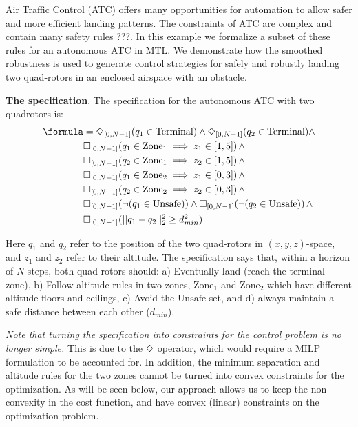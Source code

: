
Air Traffic Control (ATC) offers many opportunities for automation to allow safer and more efficient landing patterns. 
The constraints of ATC are complex and contain many safety rules \cite{}???. 
In this example we formalize a subset of these rules for an autonomous ATC in MTL.
We demonstrate how the smoothed robustness is used to generate control strategies for safely and robustly landing two quad-rotors in an enclosed airspace with an obstacle. 

\textbf{The specification}.
The specification for the autonomous ATC with two quadrotors is:
{\small
\begin{subequations}
\begin{align}
\formula &= \eventually_{[0,N-1]}(q_1 \in \text{Terminal}) \land \eventually_{[0,N-1]}(q_2 \in \text{Terminal}) \land   \nonumber \\
& \always_{[0,N-1]} (q_1 \in \text{Zone}_1 \implies z_1 \in [1,5]) \, \land \nonumber \\
& \always_{[0,N-1]} (q_2 \in \text{Zone}_1 \implies z_2 \in [1,5]) \, \land \nonumber \\
& \always_{[0,N-1]} (q_1 \in \text{Zone}_2 \implies z_1 \in [0,3]) \, \land \nonumber \\
& \always_{[0,N-1]} (q_2 \in \text{Zone}_2 \implies z_2 \in [0,3]) \, \land \nonumber \\
& \always_{[0,N-1]} (\neg (q_1 \in \text{Unsafe})) \land \always_{[0,N-1]} (\neg (q_2 \in \text{Unsafe})) \, \land  \nonumber \\
& \always_{[0,N-1]} (||q_1-q_2||_2^2 \geq d_{min}^2)
\end{align}
\end{subequations}
}

Here $q_1$ and $q_2$ refer to the position of the two quad-rotors in $(x,y,z)$-space, and $z_1$ and $z_2$ refer to their altitude. 
The specification says that, within a horizon of $N$ steps,  both quad-rotors 
should: 
a) Eventually land (reach the terminal zone), 
b) Follow altitude rules in two zones, $\text{Zone}_1$ and $\text{Zone}_2$ which have different altitude floors and ceilings,
c) Avoid the $\text{Unsafe}$ set, and d) always maintain a safe distance between each other ($d_{min}$). 

\textit{Note that turning the specification into constraints for the control problem is no longer simple.}
This is due to the $\Diamond$ operator, which would require a MILP formulation to be accounted for. 
In addition, the minimum separation and altitude rules for the two zones cannot be turned into convex constraints for the optimization. As will be seen below, our approach allows us to keep the non-convexity in the cost function, and have convex (linear) constraints on the optimization problem.

